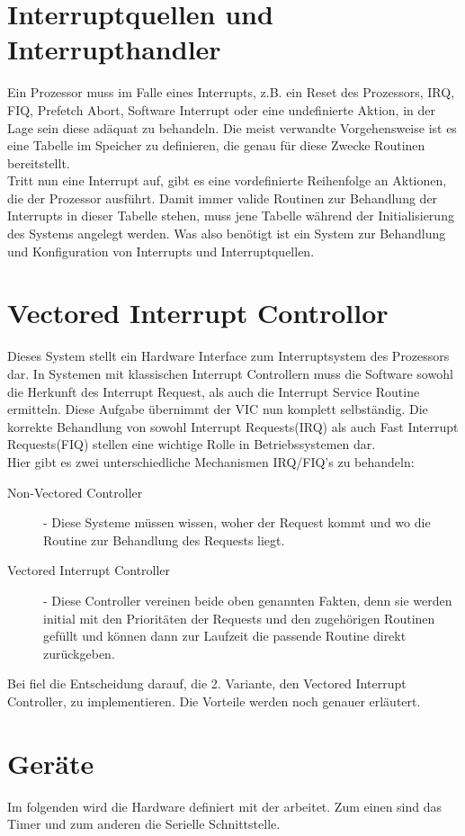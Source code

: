 \section{Interruptquellen und Interrupthandler}
Ein Prozessor muss im Falle eines Interrupts, z.B. ein Reset des Prozessors, IRQ, FIQ, Prefetch Abort, Software Interrupt oder eine undefinierte Aktion, in der Lage sein diese ad\"aquat zu behandeln. Die meist verwandte Vorgehensweise ist es eine Tabelle im Speicher zu definieren, die genau f\"ur diese Zwecke Routinen bereitstellt\parencite[53]{archManI}.\\ Tritt nun eine Interrupt auf, gibt es eine vordefinierte Reihenfolge an Aktionen, die der Prozessor ausf\"uhrt. Damit immer valide Routinen zur Behandlung der Interrupts in dieser Tabelle stehen, muss jene Tabelle w\"ahrend der Initialisierung des Systems angelegt werden. Was \mops also ben\"otigt ist ein System zur Behandlung und Konfiguration von Interrupts und Interruptquellen.
\section{Vectored Interrupt Controllor}
Dieses System stellt ein Hardware Interface zum Interruptsystem des Prozessors dar. In Systemen mit klassischen Interrupt Controllern muss die Software sowohl die Herkunft des Interrupt Request, als auch die Interrupt Service Routine ermitteln. Diese Aufgabe \"ubernimmt der VIC nun komplett selbst\"andig.
Die korrekte Behandlung von sowohl Interrupt Requests(IRQ) als auch Fast Interrupt Requests(FIQ) stellen eine wichtige Rolle in Betriebssystemen dar.\\
Hier gibt es zwei unterschiedliche Mechanismen IRQ/FIQ's zu behandeln:

\begin{description}
	\item[Non-Vectored Controller] - Diese Systeme m\"ussen wissen, woher der Request kommt und wo die Routine zur Behandlung des Requests liegt.
	\item[Vectored Interrupt Controller] - Diese Controller vereinen beide oben genannten Fakten, denn sie werden initial mit den Priorit\"aten der Requests und den zugeh\"origen Routinen gef\"ullt und k\"onnen dann zur Laufzeit die passende Routine direkt zur\"uckgeben.
\end{description}
Bei \mops fiel die Entscheidung darauf, die 2. Variante, den Vectored Interrupt Controller, zu implementieren. Die Vorteile werden noch genauer erl\"autert.
\section{Ger\"ate}
Im folgenden wird die Hardware definiert mit der \mops arbeitet. Zum einen sind das Timer und zum anderen die Serielle Schnittstelle.
